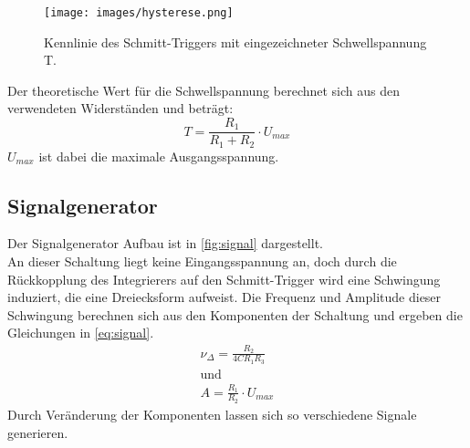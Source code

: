 \begin{figure}[H]
    \centering
    \texttt{[image: images/hysterese.png]}
    \caption{Kennlinie des Schmitt-Triggers mit eingezeichneter Schwellspannung T.\cite{schmitt}}
    \label{fig:hysterese}
\end{figure}

Der theoretische Wert für die Schwellspannung berechnet sich aus den verwendeten Widerständen und beträgt:
\begin{equation}
    T = \frac{R_1}{R_1 + R_2}\cdot U_{max}
    \label{eq:schmitt}
\end{equation}
$U_{max}$ ist dabei die maximale Ausgangsspannung.

\subsection{Signalgenerator}
Der Signalgenerator Aufbau ist in \autoref{fig:signal} dargestellt.\\
An dieser Schaltung liegt keine Eingangsspannung an, doch durch die Rückkopplung des Integrierers auf den Schmitt-Trigger wird eine Schwingung induziert, die eine Dreiecksform aufweist.
Die Frequenz und Amplitude dieser Schwingung berechnen sich aus den Komponenten der Schaltung und ergeben die Gleichungen in \ref{eq:signal}.
\begin{equation}
    \begin{aligned}
        \nu_{\Delta} = \frac{R_2}{4CR_1R_3}\\
        \text{und}\\
        A = \frac{R_1}{R_2}\cdot U_{max}
    \end{aligned}
    \label{eq:signal}
\end{equation}
Durch Veränderung der Komponenten lassen sich so verschiedene Signale generieren.